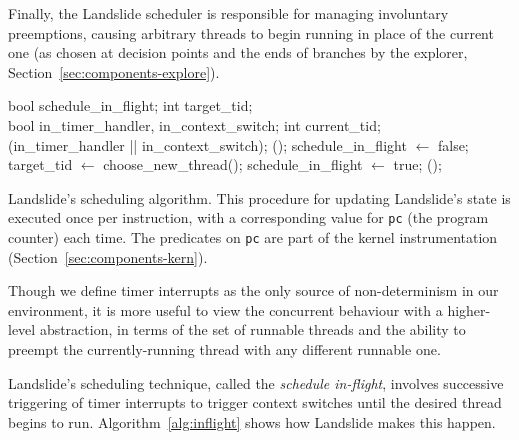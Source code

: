 Finally, the Landslide scheduler is responsible for managing involuntary preemptions, causing arbitrary threads to begin running in place of the current one (as chosen at decision points and the ends of branches by the explorer, Section~\ref{sec:components-explore}).

\begin{algorithm}[t]
	\footnotesize
	\begin{algorithmic}
		\State bool schedule\_in\_flight;
		\State int target\_tid;
		\\
		\State bool in\_timer\_handler, in\_context\_switch;
		\State int current\_tid;
		\\
				(in\_timer\_handler || in\_context\_switch);
						();
					\Else
						\State schedule\_in\_flight $\gets$ false;
					\EndIf
				\EndIf
				\State target\_tid $\gets$ {\sc choose\_new\_thread}();
				\State schedule\_in\_flight $\gets$ true;
				();
			\EndIf
		\EndFunction
	\end{algorithmic}
	\caption{Landslide's scheduling algorithm. This procedure for updating Landslide's state is executed once per instruction, with a corresponding value for \texttt{pc} (the program counter) each time. The predicates on \texttt{pc} are part of the kernel instrumentation (Section~\ref{sec:components-kern}).}
	\label{alg:inflight}
\end{algorithm}

Though we define timer interrupts as the only source of non-determinism in our environment, it is more useful to view the concurrent behaviour with a higher-level abstraction, in terms of the set of runnable threads and the ability to preempt the currently-running thread with any different runnable one.

Landslide's scheduling technique, called the {\em schedule in-flight}, involves successive triggering of timer interrupts to trigger context switches until the desired thread begins to run. Algorithm~\ref{alg:inflight} shows how Landslide makes this happen.

